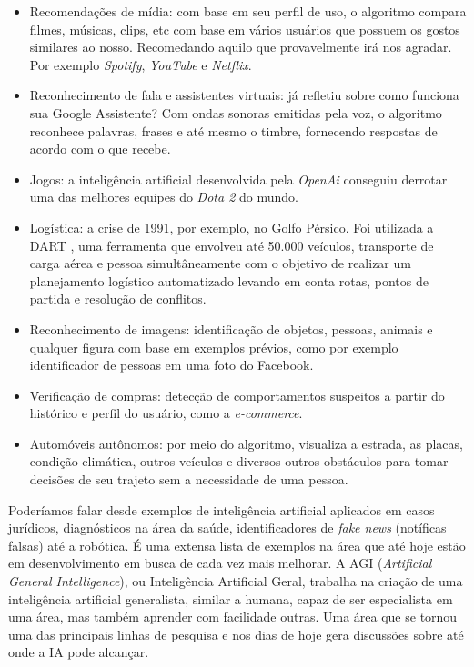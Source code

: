 \documentclass[
]{book}
\begin{document}
\begin{itemize}
\item
  Recomendações de mídia: com base em seu perfil de uso, o algoritmo compara filmes, músicas, clips, etc com base em vários usuários que possuem os gostos similares ao nosso. Recomedando aquilo que provavelmente irá nos agradar. Por exemplo \emph{Spotify}, \emph{YouTube} e \emph{Netflix}.
\item
  Reconhecimento de fala e assistentes virtuais: já refletiu sobre como funciona sua Google Assistente? Com ondas sonoras emitidas pela voz, o algoritmo reconhece palavras, frases e até mesmo o timbre, fornecendo respostas de acordo com o que recebe.
\item
  Jogos: a inteligência artificial desenvolvida pela \emph{OpenAi} conseguiu derrotar uma das melhores equipes do \emph{Dota 2} do mundo.
\item
  Logística: a crise de 1991, por exemplo, no Golfo Pérsico. Foi utilizada a DART \citep{cross1994dart}, uma ferramenta que envolveu até 50.000 veículos, transporte de carga aérea e pessoa simultâneamente com o objetivo de realizar um planejamento logístico automatizado levando em conta rotas, pontos de partida e resolução de conflitos.
\item
  Reconhecimento de imagens: identificação de objetos, pessoas, animais e qualquer figura com base em exemplos prévios, como por exemplo identificador de pessoas em uma foto do Facebook.
\item
  Verificação de compras: detecção de comportamentos suspeitos a partir do histórico e perfil do usuário, como a \emph{e-commerce}.
\item
  Automóveis autônomos: por meio do algoritmo, visualiza a estrada, as placas, condição climática, outros veículos e diversos outros obstáculos para tomar decisões de seu trajeto sem a necessidade de uma pessoa.
\end{itemize}

Poderíamos falar desde exemplos de inteligência artificial aplicados em casos jurídicos, diagnósticos na área da saúde, identificadores de \emph{fake news} (notíficas falsas) até a robótica. É uma extensa lista de exemplos na área que até hoje estão em desenvolvimento em busca de cada vez mais melhorar. A AGI (\emph{Artificial General Intelligence}), ou Inteligência Artificial Geral, trabalha na criação de uma inteligência artificial generalista, similar a humana, capaz de ser especialista em uma área, mas também aprender com facilidade outras. Uma área que se tornou uma das principais linhas de pesquisa e nos dias de hoje gera discussões sobre até onde a IA pode alcançar.
\end{document}
